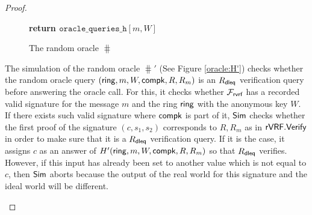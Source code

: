\begin{proof}
\begin{itemize}
\begin{figure}
{{					%
					
					\textbf{return $  \mathtt{oracle\_queries\_h}[m,  W] $}
					
			}}	
			\caption{The random oracle $ \hash $}
			\label{oracle:HnoPK}
		\end{figure}
		
		The simulation of the random oracle $ \hash' $ (See Figure \ref{oracle:H'}) checks whether the random oracle query $ (\mathsf{ring},m,W,\mathsf{compk},R,R_m) $ is an $ R_{\mathsf{dleq}} $ verification query before answering the oracle call. For this, it checks whether $ \mathcal{F}_{\textsf{rvrf}} $ has a recorded valid signature for the message $ m $ and the ring $ \mathsf{ring} $ with the anonymous key $ W $. If there exists such valid signature where $ \mathsf{compk} $ is part of it, $ \mathsf{Sim} $ checks whether the first proof of the signature $ (c,s_1, s_2) $ corresponds to $ R, R_m $ as in $ {\mathsf{rVRF}}.{\mathsf{Verify}} $ in order to make sure that it is a $ R_{\mathsf{dleq}} $ verification query. If it is the case, it assigns $ c $ as an answer of $ H' (\mathsf{ring},m,W,\mathsf{compk},R,R_m) $ so that $ R_{\mathsf{dleq}} $ verifies. However, if this input has already been set to another value which is not equal to $ c $, then $ \mathsf{Sim} $ aborts because the output of the real world for this signature and the ideal world will be different.
		
		
		\begin{figure}
			\centering
			
			\noindent{}
\end{figure}
\end{itemize}
\end{proof}

